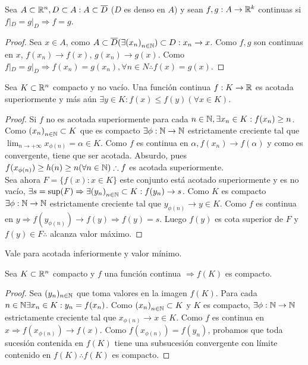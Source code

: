 \clearpage

\begin{prop}
  Sea \(A \subset \mathbb{R}^n, D \subset A : A \subset \overline{D} \) (\(D\) es denso en \(A\)) y sean \(f, g : A \to \mathbb{R}^k\) continuas si \(f|_D = g|_D \Rightarrow f=g\).

  \begin{proof}
    Sea \(x \in A\), como \(A \subset \overline{D} (\exists {(x_n)}_{n \in \mathbb{N}}) \subset D : x_n \to x\). Como \(f, g\) son continuas en \(x\), \(f(x_n) \to f(x)\), \(g(x_n) \to g(x)\). Como \(f|_D = g|_D \Rightarrow f(x_n) = g(x_n), \forall n \in N \therefore f(x) = g(x)\).
  \end{proof}
\end{prop}

\begin{theorem}[Weiertrass]
  Sea \(K \subset \mathbb{R}^n\) compacto y no vacío. Una función continua \(f: K \to \mathbb{R} \) es acotada superiormente y más aún \(\exists y \in K : f(x) \leq f(y) (\forall x \in K)\).
  \begin{proof}
    Si \(f\) no es acotada superiormente para cada \(n \in \mathbb{N}, \exists x_n \in K : f(x_n) \geq n\). Como \({(x_n)}_{n \in \mathbb{N}} \subset K\) que es compacto \(\exists \phi: \mathbb{N} \to \mathbb{N} \) estrictamente creciente tal que \(\lim_{n \to +\infty} x_{\phi(n)} = \alpha \in K\). Como \(f\) es continua en \(\alpha, f(x_n) \to f(\alpha)\) y como es convergente, tiene que ser acotada. Absurdo, pues \(f(x_{\phi(n)}) \geq h(n) \geq n (\forall n \in \mathbb{N}) \therefore f\) es acotada superiormente. \\
    Sea ahora \(F = \{ f(x) : x \in K\} \) este conjunto está acotado superiormente y es no vacío, \(\exists s = \sup(F) \Rightarrow \exists {(y_n)}_{n \in \mathbb{N}} \subset K : f(y_n) \to s\). Como \(K\) es compacto \(\exists \phi : \mathbb{N} \to \mathbb{N} \) estrictamente creciente tal que \(y_{\phi(n)} \to y \in K\). Como \(f\) es continua en \(y \Rightarrow f(y_{\phi(n)}) \to f(y) \Rightarrow f(y) = s\). Luego \(f(y)\) es cota superior de \(F\) y \(f(y) \in F \therefore \) alcanza valor máximo.
  \end{proof}
\end{theorem}

\begin{note}
  Vale para acotada inferiormente y valor mínimo.
\end{note}

\begin{theorem}
  Sea \(K \subset \mathbb{R}^n\) compacto y \(f\) una función continua \(\Rightarrow f(K)\) es compacto.
  \begin{proof}
    Sea \((y_n)_{n \in \mathbb{N}} \) que toma valores en la imagen \(f(K)\). Para cada \(n \in \mathbb{N} \exists x_n \in K : y_n = f(x_n)\). Como \({(x_n)}_{n \in \mathbb{N}} \subset K\) y \(K\) es compacto, \(\exists \phi : \mathbb{N} \to \mathbb{N} \) estrictamente creciente tal que \(x_{\phi(n)} \to x \in K\). Como \(f\) es continua en \(x \Rightarrow f(x_{\phi(n)}) \to f(x)\). Como \(f(x_{\phi(n)}) = f(y_n)\), probamos que toda sucesión contenida en \(f(K)\) tiene una subsucesión convergente con límite contenido en \(f(K) \therefore f(K)\) es compacto.
  \end{proof}
\end{theorem}

